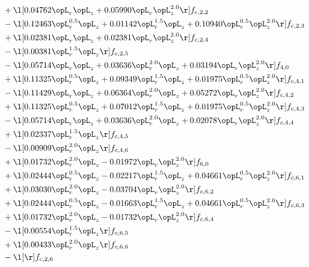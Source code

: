 \begin{alignat}{2}
& + \l[  0.04762 \opL_r \opL_z +  0.05990 \opL_r \opL_z^{2.0}  \r] f_{c,2,2} \nonumber \\ 
& - \l[  0.12463 \opL_r^{0.5} \opL_z +  0.01142 \opL_r^{1.5} \opL_z +  0.10940 \opL_r^{0.5} \opL_z^{2.0}  \r] f_{c,2,3} \nonumber \\ 
& + \l[  0.02381 \opL_r \opL_z +  0.02381 \opL_r \opL_z^{2.0}  \r] f_{c,2,4} \nonumber \\ 
& - \l[  0.00381 \opL_r^{1.5} \opL_z  \r] f_{c,2,5} \nonumber \\ 
& - \l[  0.05714 \opL_r \opL_z +  0.03636 \opL_r^{2.0} \opL_z +  0.03194 \opL_r \opL_z^{2.0}  \r] f_{4,0} \nonumber \\ 
& + \l[  0.11325 \opL_r^{0.5} \opL_z +  0.09349 \opL_r^{1.5} \opL_z +  0.01975 \opL_r^{0.5} \opL_z^{2.0}  \r] f_{c,4,1} \nonumber \\ 
& - \l[  0.11429 \opL_r \opL_z +  0.06364 \opL_r^{2.0} \opL_z +  0.05272 \opL_r \opL_z^{2.0}  \r] f_{c,4,2} \nonumber \\ 
& + \l[  0.11325 \opL_r^{0.5} \opL_z +  0.07012 \opL_r^{1.5} \opL_z +  0.01975 \opL_r^{0.5} \opL_z^{2.0}  \r] f_{c,4,3} \nonumber \\ 
& - \l[  0.05714 \opL_r \opL_z +  0.03636 \opL_r^{2.0} \opL_z +  0.02078 \opL_r \opL_z^{2.0}  \r] f_{c,4,4} \nonumber \\ 
& + \l[  0.02337 \opL_r^{1.5} \opL_z  \r] f_{c,4,5} \nonumber \\ 
& - \l[  0.00909 \opL_r^{2.0} \opL_z  \r] f_{c,4,6} \nonumber \\ 
& + \l[  0.01732 \opL_r^{2.0} \opL_z   -0.01972 \opL_r \opL_z^{2.0}  \r] f_{6,0} \nonumber \\ 
& + \l[  0.02444 \opL_r^{0.5} \opL_z   -0.02217 \opL_r^{1.5} \opL_z +  0.04661 \opL_r^{0.5} \opL_z^{2.0}  \r] f_{c,6,1} \nonumber \\ 
& + \l[  0.03030 \opL_r^{2.0} \opL_z   -0.03704 \opL_r \opL_z^{2.0}  \r] f_{c,6,2} \nonumber \\ 
& + \l[  0.02444 \opL_r^{0.5} \opL_z   -0.01663 \opL_r^{1.5} \opL_z +  0.04661 \opL_r^{0.5} \opL_z^{2.0}  \r] f_{c,6,3} \nonumber \\ 
& + \l[  0.01732 \opL_r^{2.0} \opL_z   -0.01732 \opL_r \opL_z^{2.0}  \r] f_{c,6,4} \nonumber \\ 
& - \l[  0.00554 \opL_r^{1.5} \opL_z  \r] f_{c,6,5} \nonumber \\ 
& + \l[  0.00433 \opL_r^{2.0} \opL_z  \r] f_{c,6,6} \nonumber \\ 
& - \l[  \r] f_{c,2,6} \nonumber \\ 
\end{alignat} 


